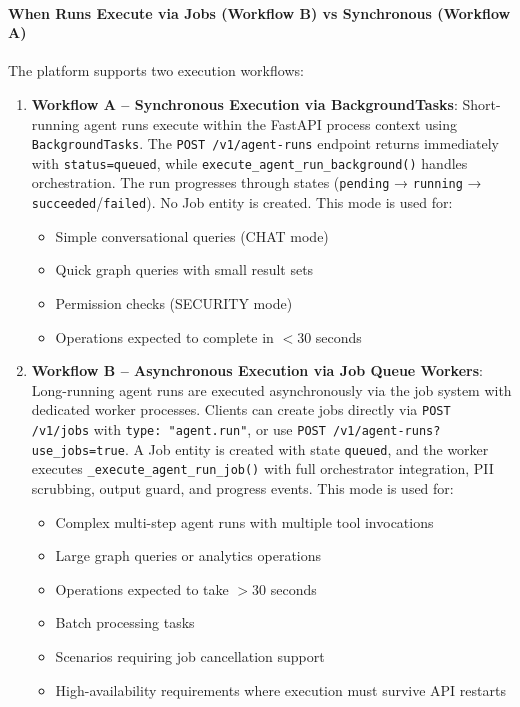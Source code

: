 \documentclass[a4paper,twoside]{sapthesis}
\begin{document}
\paragraph{When Runs Execute via Jobs (Workflow B) vs Synchronous (Workflow A)}

The platform supports two execution workflows:

\begin{enumerate}
    \item \textbf{Workflow A -- Synchronous Execution via BackgroundTasks}: Short-running agent runs execute within the FastAPI process context using \texttt{BackgroundTasks}. The \texttt{POST /v1/agent-runs} endpoint returns immediately with \texttt{status=queued}, while \texttt{execute\_agent\_run\_background()} handles orchestration. The run progresses through states (\texttt{pending} → \texttt{running} → \texttt{succeeded}/\texttt{failed}). No Job entity is created. This mode is used for:
    \begin{itemize}
        \item Simple conversational queries (CHAT mode)
        \item Quick graph queries with small result sets
        \item Permission checks (SECURITY mode)
        \item Operations expected to complete in $<$30 seconds
    \end{itemize}
    
    \item \textbf{Workflow B -- Asynchronous Execution via Job Queue Workers}: Long-running agent runs are executed asynchronously via the job system with dedicated worker processes. Clients can create jobs directly via \texttt{POST /v1/jobs} with \texttt{type: "agent.run"}, or use \texttt{POST /v1/agent-runs?use\_jobs=true}. A Job entity is created with state \texttt{queued}, and the worker executes \texttt{\_execute\_agent\_run\_job()} with full orchestrator integration, PII scrubbing, output guard, and progress events. This mode is used for:
    \begin{itemize}
        \item Complex multi-step agent runs with multiple tool invocations
        \item Large graph queries or analytics operations
        \item Operations expected to take $>$30 seconds
        \item Batch processing tasks
        \item Scenarios requiring job cancellation support
        \item High-availability requirements where execution must survive API restarts
    \end{itemize}
\end{enumerate}
\end{document}
